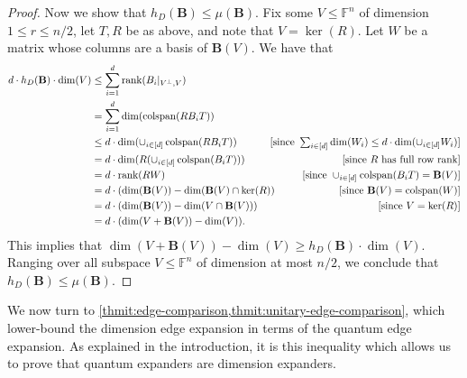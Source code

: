 \documentclass[11pt]{article}
\theoremstyle{plain}
\numberwithin{equation}{section}
\theoremstyle{definition}
\newcommand{\F}{\mathbb{F}}
\newcommand{\rk}{\mathrm{rank}}
\newcommand{\tuple}[1]{\mathbf{#1}}
\newcommand{\vB}{\tuple{B}}
\newcommand{\colspan}{\operatorname{colspan}}
\newcommand{\ann}{V^{\perp}}
\DeclareMathOperator{\rank}{rank}
\begin{document}
\begin{proof}
  Now we show that $ h_D(\vB)\leq \mu(\vB)$. Fix some $V\leq \F^n$ of dimension $1\leq r\leq n/2$, let $T,R$ be as above, and note that $V=\ker(R)$. Let $W$ be a matrix whose columns are a basis of $\vB(V)$. 
  We have that
%
%
  \begin{align*}
    d\cdot h_D(\vB)\cdot\dim(V)  &\leq  \sum_{i=1}^d\rk(B_i|_{\ann, V}) \\
    & =  \sum_{i=1}^d\dim(\colspan(RB_iT)) \\
    & \leq d\cdot\dim(\cup_{i\in[d]}\colspan(RB_iT)) & \hspace{-14.6pt}[\text{since }\textstyle\sum_{i\in[d]}\dim(W_i)\leq d\cdot \dim(\cup_{i\in[d]}W_i) ]\\
    & =  d\cdot\dim(R(\cup_{i\in[d]}\colspan(B_iT)))& [\text{since }R\text{ has full row rank} ]\\
    & =  d\cdot\rank(RW) &[\text{since }\cup_{i\in[d]} \colspan(B_iT)=\vB(V) ]\\
    & =  d\cdot(\dim(\vB(V))-\dim(\vB(V) \cap \ker(R)) & [\text{since }\vB(V)=\colspan(W)]\\
    & =  d\cdot(\dim(\vB(V))-\dim(V\cap\vB(V))) & [\text{since }V=\ker(R)]\\
    & =  d\cdot(\dim(V+\vB(V))-\dim(V)).
  \end{align*}
  This implies that $\dim(V+\vB(V))-\dim (V)\geq h_D(\vB)\cdot \dim(V)$. Ranging over all subspace $V\leq\F^n$ of dimension at most $n/2$,
  we conclude that $ h_D(\vB)\leq \mu(\vB)$.
\end{proof} 
We now turn to \cref{thmit:edge-comparison,thmit:unitary-edge-comparison}, which lower-bound the dimension edge expansion in terms of the quantum edge expansion. As explained in the introduction, it is this inequality which allows us to prove that quantum expanders are dimension expanders.
\end{document}
